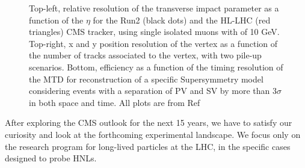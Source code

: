 \begin{figure}[h]
\caption{Top-left, relative resolution of the transverse impact
parameter as a function of the $\eta$ for the Run2 (black dots) and the
HL-LHC (red triangles) CMS tracker, using single isolated muons with
\pt of 10 GeV. Top-right, x and y position resolution of the vertex as a function of the
number of tracks associated to the vertex, with two pile-up scenarios. 
 Bottom, efficiency as a function of the timing
resolution of the MTD for reconstruction of a specific Supersymmetry
model considering events with a separation of
PV and SV by more than 3$\sigma$ in both space and time. All plots are
  from Ref~\cite{Alimena_2020}}
\label{fig:MDT_alimena}
\end{figure}

After exploring the CMS outlook for the next 15 years, we have to satisfy
our curiosity and look at the forthcoming experimental landscape. We
focus only on the research program for long-lived particles at the LHC,
in the specific cases designed to probe HNLs.

